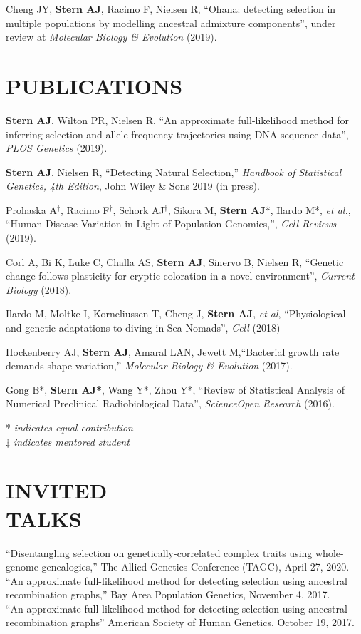 \documentclass[margin, 10pt]{res} %
\begin{document}
\begin{resume}
Cheng JY, {\bf Stern AJ}, Racimo F, Nielsen R, ``Ohana: detecting selection in multiple populations by
modelling ancestral admixture components'', under review at {\it Molecular Biology \& Evolution} (2019).


\section{PUBLICATIONS}

{\bf Stern AJ}, Wilton PR, Nielsen R, ``An approximate full-likelihood method for inferring selection and allele frequency trajectories using DNA sequence data'', {\it PLOS Genetics} (2019).

{\bf Stern AJ}, Nielsen R, ``Detecting Natural Selection,'' {\it Handbook of Statistical Genetics, 4th Edition},  John Wiley \& Sons 2019 (in press).

Prohaska A$^\dag$, Racimo F$^\dag$, Schork AJ$^\dag$, Sikora M, {\bf Stern AJ}*, Ilardo M*, {\it et al.}, ``Human Disease Variation in Light of Population Genomics,'',  {\it Cell Reviews} (2019).

Corl A, Bi K, Luke C, Challa AS, {\bf Stern AJ}, Sinervo B, Nielsen R, ``Genetic change follows plasticity for cryptic coloration in a novel environment'', {\it Current Biology} (2018).

Ilardo M, Moltke I, Korneliussen T, Cheng J, {\bf Stern AJ}, {\it et al}, ``Physiological and genetic adaptations to diving in Sea Nomads'', {\it Cell} (2018)

Hockenberry AJ, {\bf Stern AJ}, Amaral LAN, Jewett M,``Bacterial growth rate demands shape variation,'' {\it Molecular Biology \& Evolution} (2017).

Gong B*, {\bf Stern AJ*}, Wang Y*, Zhou Y*, ``Review of Statistical Analysis of Numerical Preclinical Radiobiological Data'', {\it ScienceOpen Research} (2016). 


* {\it indicates equal contribution}\\
$\ddag$ {\it indicates mentored student}


\section{INVITED\\TALKS}
``Disentangling selection on genetically-correlated complex traits using whole-genome genealogies,'' The Allied Genetics Conference (TAGC), April 27, 2020.\\
``An approximate full-likelihood method for detecting selection using ancestral recombination graphs,'' Bay Area Population Genetics, November 4, 2017.\\
``An approximate full-likelihood method for detecting selection using ancestral recombination graphs'' American Society of Human Genetics, October 19, 2017.


\end{resume}
\end{document}
